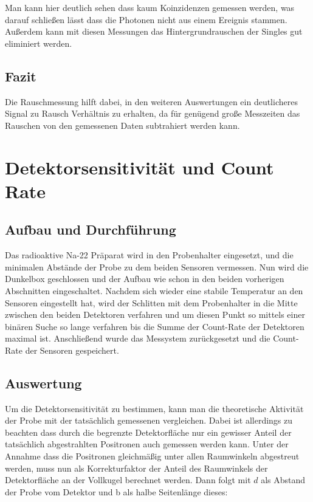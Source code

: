 \documentclass[12pt,twoside,a4paper]{scrartcl}
\begin{document}
		Man kann hier deutlich sehen dass kaum Koinzidenzen gemessen werden, was darauf schließen lässt dass die Photonen nicht aus einem Ereignis stammen.
		Außerdem kann mit diesen Messungen das Hintergrundrauschen der Singles gut eliminiert werden.

		\subsection{Fazit}

		Die Rauschmessung hilft dabei, in den weiteren Auswertungen ein deutlicheres Signal zu Rausch Verhältnis zu erhalten, da für genügend große Messzeiten das Rauschen von den gemessenen Daten subtrahiert werden kann.

	\section{Detektorsensitivität und Count Rate}

		\subsection{Aufbau und Durchführung}

			Das radioaktive Na-22 Präparat wird in den Probenhalter eingesetzt, und die minimalen Abstände der Probe zu dem beiden Sensoren vermessen. Nun wird die Dunkelbox geschlossen und der Aufbau wie schon in den beiden vorherigen Abschnitten eingeschaltet. Nachdem sich wieder eine stabile Temperatur an den Sensoren eingestellt hat, wird der Schlitten mit dem Probenhalter in die Mitte zwischen den beiden Detektoren verfahren und um diesen Punkt so mittels einer binären Suche so lange verfahren bis die Summe der Count-Rate der Detektoren maximal ist. Anschließend wurde das Messystem zurückgesetzt und die Count-Rate der Sensoren gespeichert.

		\subsection{Auswertung}

			Um die Detektorsensitivität zu bestimmen, kann man die theoretische Aktivität der Probe mit der tatsächlich gemessenen vergleichen.
			Dabei ist allerdings zu beachten dass durch die begrenzte Detektorfläche nur ein gewisser Anteil der tatsächlich abgestrahlten Positronen auch gemessen werden kann.
			Unter der Annahme dass die Positronen gleichmäßig unter allen Raumwinkeln abgestreut werden, muss nun als Korrekturfaktor der Anteil des Raumwinkels der Detektorfläche an der Vollkugel berechnet werden. Dann folgt mit $d$ als Abstand der Probe vom Detektor und b als halbe Seitenlänge dieses:
\end{document}
